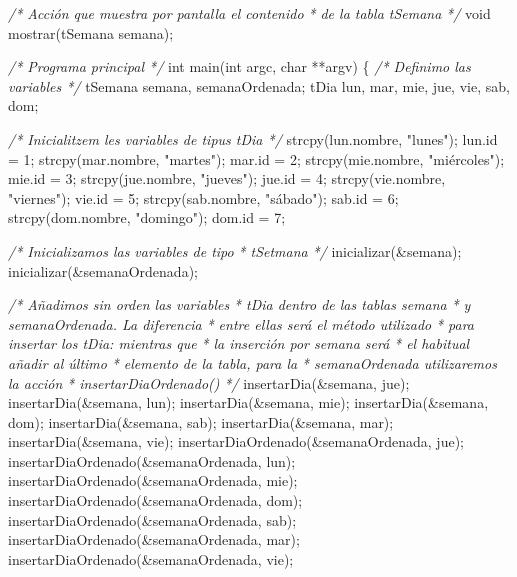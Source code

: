 \documentclass[
]{book}
\newenvironment{Shaded}{\begin{snugshade}}{\end{snugshade}}
\newcommand{\CommentTok}[1]{\textcolor[rgb]{0.56,0.35,0.01}{\textit{#1}}}
\newcommand{\DataTypeTok}[1]{\textcolor[rgb]{0.13,0.29,0.53}{#1}}
\newcommand{\DecValTok}[1]{\textcolor[rgb]{0.00,0.00,0.81}{#1}}
\newcommand{\NormalTok}[1]{#1}
\newcommand{\StringTok}[1]{\textcolor[rgb]{0.31,0.60,0.02}{#1}}
\begin{document}
\begin{Shaded}
\begin{Highlighting}[]
\CommentTok{/* Acción que muestra por pantalla el contenido}
\CommentTok{ * de la tabla tSemana}
\CommentTok{ */}
\DataTypeTok{void}\NormalTok{ mostrar(tSemana semana);}

\CommentTok{/* Programa principal */}
\DataTypeTok{int}\NormalTok{ main(}\DataTypeTok{int}\NormalTok{ argc, }\DataTypeTok{char}\NormalTok{ **argv) \{}
    \CommentTok{/* Definimo las variables */}
\NormalTok{    tSemana semana, semanaOrdenada;}
\NormalTok{    tDia lun, mar, mie, jue, vie, sab, dom; }
    
    \CommentTok{/* Inicialitzem les variables de tipus tDia */}
\NormalTok{    strcpy(lun.nombre, }\StringTok{"lunes"}\NormalTok{);}
\NormalTok{    lun.id = }\DecValTok{1}\NormalTok{;}
\NormalTok{    strcpy(mar.nombre, }\StringTok{"martes"}\NormalTok{);}
\NormalTok{    mar.id = }\DecValTok{2}\NormalTok{;}
\NormalTok{    strcpy(mie.nombre, }\StringTok{"miércoles"}\NormalTok{);}
\NormalTok{    mie.id = }\DecValTok{3}\NormalTok{;}
\NormalTok{    strcpy(jue.nombre, }\StringTok{"jueves"}\NormalTok{);}
\NormalTok{    jue.id = }\DecValTok{4}\NormalTok{;}
\NormalTok{    strcpy(vie.nombre, }\StringTok{"viernes"}\NormalTok{);}
\NormalTok{    vie.id = }\DecValTok{5}\NormalTok{;}
\NormalTok{    strcpy(sab.nombre, }\StringTok{"sábado"}\NormalTok{);}
\NormalTok{    sab.id = }\DecValTok{6}\NormalTok{;}
\NormalTok{    strcpy(dom.nombre, }\StringTok{"domingo"}\NormalTok{);}
\NormalTok{    dom.id = }\DecValTok{7}\NormalTok{;}
    
    \CommentTok{/* Inicializamos las variables de tipo}
\CommentTok{     * tSetmana }
\CommentTok{     */}
\NormalTok{    inicializar(\&semana);}
\NormalTok{    inicializar(\&semanaOrdenada);}
    
    \CommentTok{/* Añadimos sin orden las variables}
\CommentTok{     * tDia dentro de las tablas semana}
\CommentTok{     * y semanaOrdenada. La diferencia}
\CommentTok{     * entre ellas será el método utilizado}
\CommentTok{     * para insertar los tDia: mientras que}
\CommentTok{     * la inserción por semana será}
\CommentTok{     * el habitual añadir al último}
\CommentTok{     * elemento de la tabla, para la}
\CommentTok{     * semanaOrdenada utilizaremos la acción}
\CommentTok{     * insertarDiaOrdenado()}
\CommentTok{     */}
\NormalTok{    insertarDia(\&semana, jue);}
\NormalTok{    insertarDia(\&semana, lun);}
\NormalTok{    insertarDia(\&semana, mie);}
\NormalTok{    insertarDia(\&semana, dom);}
\NormalTok{    insertarDia(\&semana, sab);}
\NormalTok{    insertarDia(\&semana, mar);}
\NormalTok{    insertarDia(\&semana, vie);}
\NormalTok{    insertarDiaOrdenado(\&semanaOrdenada, jue);}
\NormalTok{    insertarDiaOrdenado(\&semanaOrdenada, lun);    }
\NormalTok{    insertarDiaOrdenado(\&semanaOrdenada, mie);}
\NormalTok{    insertarDiaOrdenado(\&semanaOrdenada, dom);}
\NormalTok{    insertarDiaOrdenado(\&semanaOrdenada, sab);}
\NormalTok{    insertarDiaOrdenado(\&semanaOrdenada, mar);}
\NormalTok{    insertarDiaOrdenado(\&semanaOrdenada, vie);}


\end{Highlighting}
\end{Shaded}
\end{document}

